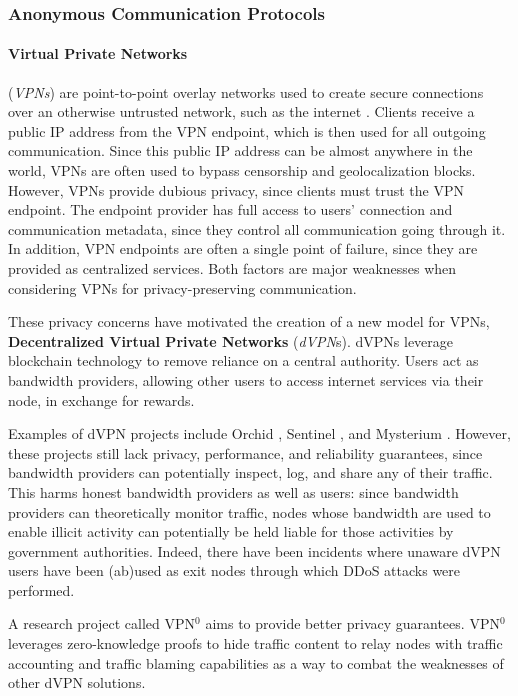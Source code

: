 \subsubsection{Anonymous Communication Protocols}
\label{sec:privacyprotocols}

\paragraph{Virtual Private Networks}(\textit{VPNs}) are point-to-point overlay networks used to create secure connections over an otherwise untrusted network, such as the internet \cite{venkateswaran_2001}. Clients receive a public IP address from the VPN endpoint, which is then used for all outgoing communication. Since this public IP address can be almost anywhere in the world, VPNs are often used to bypass censorship \cite{hobbs_roberts_2018} and geolocalization blocks. However, VPNs provide dubious privacy, since clients must trust the VPN endpoint. The endpoint provider has full access to users' connection and communication metadata, since they control all communication going through it. In addition, VPN endpoints are often a single point of failure, since they are provided as centralized services. Both factors are major weaknesses when considering VPNs for privacy-preserving communication.

These privacy concerns have motivated the creation of a new model for VPNs, \textbf{Decentralized Virtual Private Networks} (\textit{dVPN}s). dVPNs leverage blockchain technology to remove reliance on a central authority. Users act as bandwidth providers, allowing other users to access internet services via their node, in exchange for rewards.

Examples of dVPN projects include Orchid \cite{orchid}, Sentinel \cite{sentinel}, and Mysterium \cite{mysterium}. However, these projects still lack privacy, performance, and reliability guarantees, since bandwidth providers can potentially inspect, log, and share any of their traffic. This harms honest bandwidth providers as well as users: since bandwidth providers can theoretically monitor traffic, nodes whose bandwidth are used to enable illicit activity can potentially be held liable for those activities by government authorities. Indeed, there have been incidents where unaware dVPN users have been (ab)used as exit nodes through which DDoS attacks
were performed.

A research project called VPN$^0$ \cite{vpn0} aims to provide better privacy guarantees. VPN$^0$ leverages zero-knowledge proofs to hide traffic content to relay nodes with traffic accounting and traffic blaming capabilities as a way to combat the weaknesses of other dVPN solutions.

